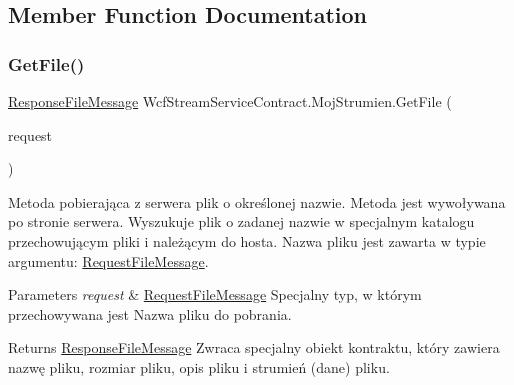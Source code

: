 \subsection{Member Function Documentation}
\mbox{\label{class_wcf_stream_service_contract_1_1_moj_strumien_af4959737574f4dca1230d168dc5846e8}} 
\subsubsection{\texorpdfstring{Get\+File()}{GetFile()}}
{\footnotesize\ttfamily \hyperlink{class_wcf_stream_service_contract_1_1_response_file_message}{Response\+File\+Message} Wcf\+Stream\+Service\+Contract.\+Moj\+Strumien.\+Get\+File (\begin{DoxyParamCaption}\item[{\hyperlink{class_wcf_stream_service_contract_1_1_request_file_message}{Request\+File\+Message}}]{request }\end{DoxyParamCaption})\hspace{0.3cm}{\ttfamily [inline]}}



Metoda pobierająca z serwera plik o określonej nazwie. Metoda jest wywoływana po stronie serwera. Wyszukuje plik o zadanej nazwie w specjalnym katalogu przechowującym pliki i należącym do hosta. Nazwa pliku jest zawarta w typie argumentu\+: \hyperlink{class_wcf_stream_service_contract_1_1_request_file_message}{Request\+File\+Message}. 


\begin{DoxyParams}{Parameters}
{\em request} & \hyperlink{class_wcf_stream_service_contract_1_1_request_file_message}{Request\+File\+Message} Specjalny typ, w którym przechowywana jest Nazwa pliku do pobrania.\\
\hline
\end{DoxyParams}
\begin{DoxyReturn}{Returns}
\hyperlink{class_wcf_stream_service_contract_1_1_response_file_message}{Response\+File\+Message} Zwraca specjalny obiekt kontraktu, który zawiera nazwę pliku, rozmiar pliku, opis pliku i strumień (dane) pliku.
\end{DoxyReturn}


